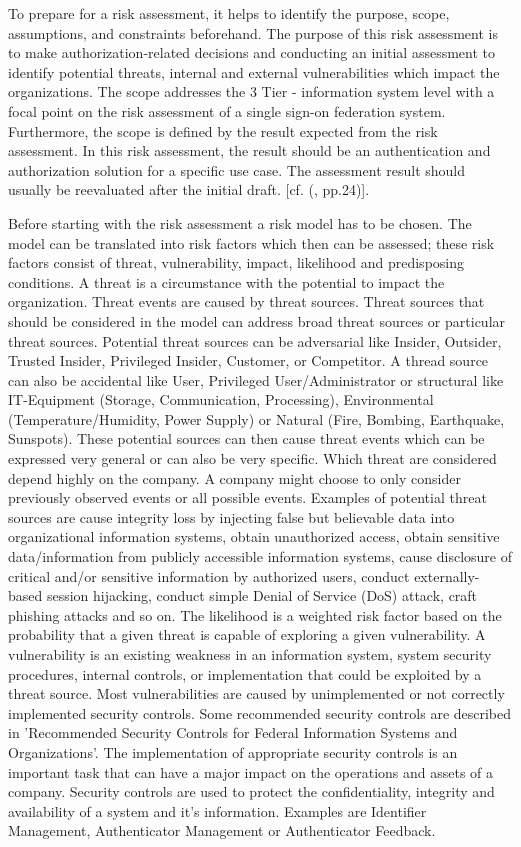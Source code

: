 To prepare for a risk assessment, it helps to identify the purpose, scope, assumptions, and constraints beforehand. The purpose of this risk assessment is to make authorization-related decisions and conducting an initial assessment to identify potential threats, internal and external vulnerabilities which impact the organizations. The scope addresses the 3 Tier -  information system level with a focal point on the risk assessment of a single sign-on federation system. Furthermore, the scope is defined by the result expected from the risk assessment. In this risk assessment, the result should be an authentication and authorization solution for a specific use case. The assessment result should usually be reevaluated after the initial draft. [cf. (\cite{NIST:2012:GCRA}, pp.24)].

Before starting with the risk assessment a risk model has to be chosen. The model can be translated into risk factors which then can be assessed; these risk factors consist of threat, vulnerability, impact, likelihood and predisposing conditions.  A threat is a circumstance with the potential to impact the organization. Threat events are caused by threat sources. Threat sources that should be considered in the model can address broad threat sources or particular threat sources. Potential threat sources can be adversarial like Insider, Outsider, Trusted Insider, Privileged Insider, Customer, or Competitor. A thread source can also be accidental like User, Privileged User/Administrator or structural like IT-Equipment (Storage, Communication, Processing), Environmental (Temperature/Humidity, Power Supply) or Natural (Fire, Bombing, Earthquake, Sunspots). These potential sources can then cause threat events which can be expressed very general or can also be very specific. Which threat are considered depend highly on the company. A company might choose to only consider previously observed events or all possible events. Examples of potential threat sources are cause integrity loss by injecting false but believable data into organizational information systems, obtain unauthorized access, obtain sensitive data/information from publicly accessible information systems, cause disclosure of critical and/or sensitive information by authorized users, conduct externally-based session hijacking, conduct simple Denial of Service (DoS) attack, craft phishing attacks and so on. The likelihood is a weighted risk factor based on the probability that a given threat is capable of exploring a given vulnerability. A vulnerability is an existing weakness in an information system, system security procedures, internal controls, or implementation that could be exploited by a threat source. Most vulnerabilities are caused by unimplemented or not correctly implemented security controls. Some recommended security controls are described in 'Recommended Security Controls for Federal Information Systems and Organizations'. The implementation of appropriate security controls is an important task that can have a major impact on the operations and assets of a company. Security controls are used to protect the confidentiality, integrity and availability of a system and it's information. Examples are Identifier Management, Authenticator Management or Authenticator Feedback. 